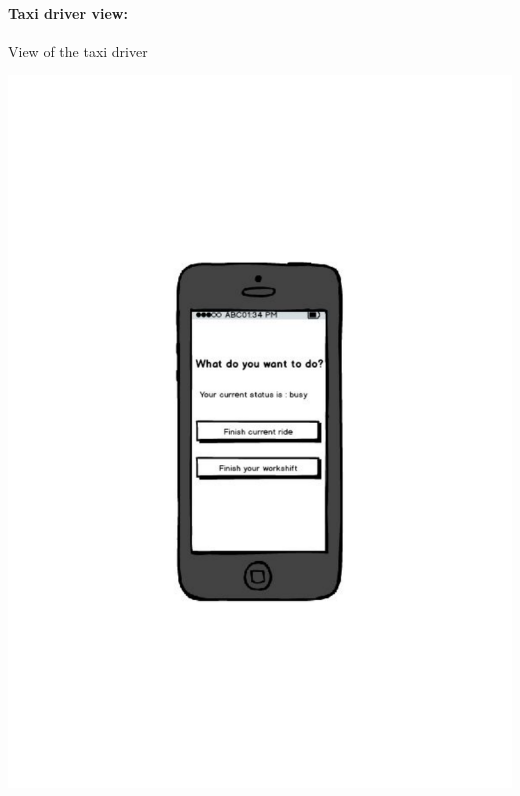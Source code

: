 \paragraph{Taxi driver view:}
View of the taxi driver
\begin{center}
	\includegraphics[width=\textwidth]{mockup/taxiDriverFunctions.pdf}
\end{center}
\newpage
